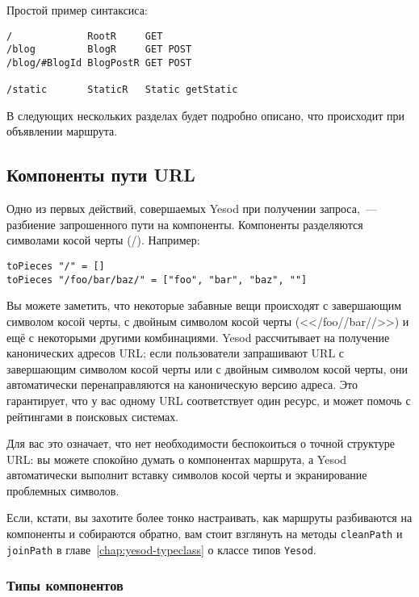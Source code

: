 Простой пример синтаксиса:
\begin{lstlisting}
/             RootR     GET
/blog         BlogR     GET POST
/blog/#BlogId BlogPostR GET POST

/static       StaticR   Static getStatic
\end{lstlisting}

В следующих нескольких разделах будет подробно описано, что происходит при объявлении
маршрута.

\subsection{Компоненты пути URL}

Одно из первых действий, совершаемых Yesod при получении запроса,~---
разбиение запрошенного пути на компоненты. Компоненты разделяются символами
косой черты (/). Например:
\begin{lstlisting}
toPieces "/" = []
toPieces "/foo/bar/baz/" = ["foo", "bar", "baz", ""]
\end{lstlisting}

Вы можете заметить, что некоторые забавные вещи происходят с
завершающим символом косой черты, с двойным символом косой черты
(<</foo//bar//>>) и ещё с некоторыми другими комбинациями.
Yesod рассчитывает на получение канонических адресов URL; если пользователи
запрашивают URL с завершающим символом косой черты или с двойным символом
косой черты, они автоматически перенаправляются на каноническую версию адреса.
Это гарантирует, что у вас одному URL соответствует один ресурс, и может
помочь с рейтингами в поисковых системах.

Для вас это означает, что нет необходимости беспокоиться о точной
структуре URL: вы можете спокойно думать о компонентах
маршрута, а Yesod автоматически выполнит вставку символов косой черты
и экранирование проблемных символов.

Если, кстати, вы захотите более тонко настраивать, как маршруты
разбиваются на компоненты и собираются обратно, вам стоит взглянуть на
методы \lstinline!cleanPath! и \lstinline!joinPath! в главе~\ref{chap:yesod-typeclass}
о классе типов \lstinline!Yesod!.

\subsubsection{Типы компонентов}

